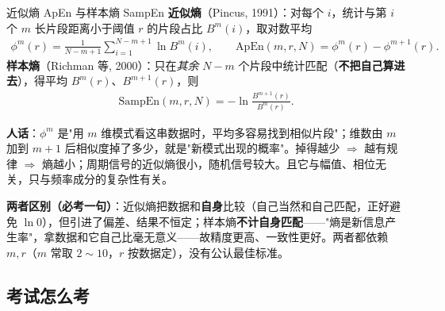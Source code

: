 \begin{defbox}{近似熵 ApEn 与样本熵 SampEn}
\textbf{近似熵}（Pincus, 1991）：对每个 $i$，统计与第 $i$ 个 $m$ 长片段距离小于阈值 $r$ 的片段占比 $B^m(i)$，取对数平均
\begin{align*}
\phi^m(r)=\frac{1}{N-m+1}\sum_{i=1}^{N-m+1}\ln B^m(i),
\qquad
\mathrm{ApEn}(m,r,N)=\phi^{m}(r)-\phi^{m+1}(r).
\end{align*}
\textbf{样本熵}（Richman 等, 2000）：只在\emph{其余} $N-m$ 个片段中统计匹配（\textbf{不把自己算进去}），得平均 $B^m(r)$、$B^{m+1}(r)$，则
\begin{align*}
\mathrm{SampEn}(m,r,N)=-\ln\frac{B^{m+1}(r)}{B^{m}(r)}.
\end{align*}
\end{defbox}

\textbf{人话}：$\phi^m$ 是"用 $m$ 维模式看这串数据时，平均多容易找到相似片段"；维数由 $m$ 加到 $m+1$ 后相似度掉了多少，就是"新模式出现的概率"。掉得越少 $\Rightarrow$ 越有规律 $\Rightarrow$ 熵越小；周期信号的近似熵很小，随机信号较大。且它与幅值、相位无关，只与频率成分的复杂性有关。

\textbf{两者区别（必考一句）}：近似熵把数据和\textbf{自身}比较（自己当然和自己匹配，正好避免 $\ln0$），但引进了偏差、结果不恒定；样本熵\textbf{不计自身匹配}——"熵是新信息产生率"，拿数据和它自己比毫无意义——故精度更高、一致性更好。两者都依赖 $m,r$（$m$ 常取 $2\sim10$，$r$ 按数据定），没有公认最佳标准。

\subsection{考试怎么考}

